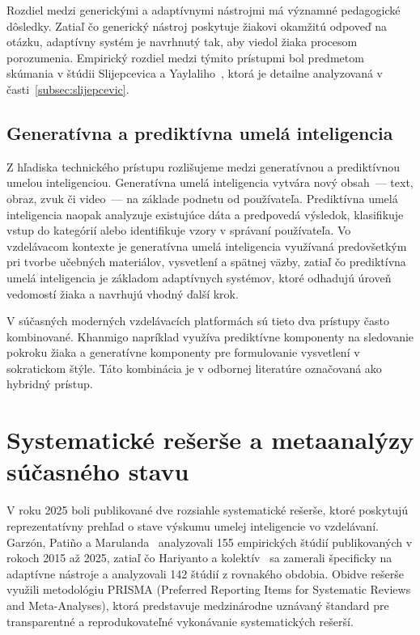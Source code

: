 Rozdiel medzi generickými a adaptívnymi nástrojmi má významné pedagogické dôsledky. Zatiaľ čo generický nástroj poskytuje žiakovi okamžitú odpoveď na otázku, adaptívny systém je navrhnutý tak, aby viedol žiaka procesom porozumenia. Empirický rozdiel medzi týmito prístupmi bol predmetom skúmania v štúdii Slijepcevica a Yaylaliho~\cite{slijepcevic2025khanmigo}, ktorá je detailne analyzovaná v časti~\ref{subsec:slijepcevic}.


\subsection{Generatívna a prediktívna umelá inteligencia}

Z hľadiska technického prístupu rozlišujeme medzi generatívnou a prediktívnou umelou inteligenciou. Generatívna umelá inteligencia vytvára nový obsah~--- text, obraz, zvuk či video~--- na základe podnetu od používateľa. Prediktívna umelá inteligencia naopak analyzuje existujúce dáta a predpovedá výsledok, klasifikuje vstup do kategórií alebo identifikuje vzory v správaní používateľa. Vo vzdelávacom kontexte je generatívna umelá inteligencia využívaná predovšetkým pri tvorbe učebných materiálov, vysvetlení a spätnej väzby, zatiaľ čo prediktívna umelá inteligencia je základom adaptívnych systémov, ktoré odhadujú úroveň vedomostí žiaka a navrhujú vhodný ďalší krok.

V súčasných moderných vzdelávacích platformách sú tieto dva prístupy často kombinované. Khanmigo napríklad využíva prediktívne komponenty na sledovanie pokroku žiaka a generatívne komponenty pre formulovanie vysvetlení v sokratickom štýle. Táto kombinácia je v odbornej literatúre označovaná ako hybridný prístup.


\section{Systematické rešerše a metaanalýzy súčasného stavu}
\label{sec:reserse}

V roku 2025 boli publikované dve rozsiahle systematické rešerše, ktoré poskytujú reprezentatívny prehľad o stave výskumu umelej inteligencie vo vzdelávaní. Garzón, Patiño a Marulanda~\cite{garzon2025systematic} analyzovali 155 empirických štúdií publikovaných v rokoch 2015 až 2025, zatiaľ čo Hariyanto a kolektív~\cite{hariyanto2025adaptive} sa zamerali špecificky na adaptívne nástroje a analyzovali 142 štúdií z rovnakého obdobia. Obidve rešerše využili metodológiu PRISMA (Preferred Reporting Items for Systematic Reviews and Meta-Analyses), ktorá predstavuje medzinárodne uznávaný štandard pre transparentné a reprodukovateľné vykonávanie systematických rešerší.


